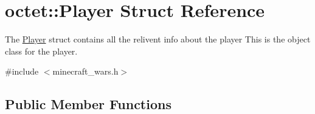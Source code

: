 \hypertarget{structoctet_1_1_player}{\section{octet\+:\+:Player Struct Reference}
\label{structoctet_1_1_player}
}


The \hyperlink{structoctet_1_1_player}{Player} struct contains all the relivent info about the player This is the object class for the player.  




{\ttfamily \#include $<$minecraft\+\_\+wars.\+h$>$}

\subsection*{Public Member Functions}
